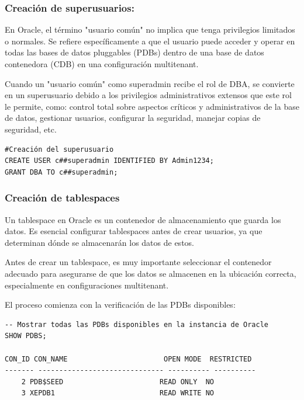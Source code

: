 \documentclass{article}
\begin{document}
\subsubsection{Creación de superusuarios:}

En Oracle, el término "usuario común" no implica que tenga privilegios limitados o normales. Se refiere específicamente a que el usuario puede acceder y operar en todas las bases de datos pluggables (PDBs) dentro de una base de datos contenedora (CDB) en una configuración multitenant. 

Cuando un "usuario común" como superadmin recibe el rol de DBA, se convierte en un superusuario debido a los privilegios administrativos extensos que este rol le permite, como: control total sobre aspectos críticos y administrativos de la base de datos, gestionar usuarios, configurar la seguridad, manejar copias de seguridad, etc.
\begin{lstlisting}[style=bashStyle]
#Creación del superusuario
CREATE USER c##superadmin IDENTIFIED BY Admin1234;
GRANT DBA TO c##superadmin;
\end{lstlisting}

\vspace{5mm}

\subsubsection{Creación de tablespaces}

Un tablespace en Oracle es un contenedor de almacenamiento que guarda los datos. Es esencial configurar tablespaces antes de crear usuarios, ya que determinan dónde se almacenarán los datos de estos.

Antes de crear un tablespace, es muy importante seleccionar el contenedor adecuado para asegurarse de que los datos se almacenen en la ubicación correcta, especialmente en configuraciones multitenant. 

El proceso comienza con la verificación de las PDBs disponibles:

\begin{lstlisting}[style=bashStyle]
-- Mostrar todas las PDBs disponibles en la instancia de Oracle
SHOW PDBS;

CON_ID CON_NAME                       OPEN MODE  RESTRICTED
------- ------------------------------ ---------- ----------
    2 PDB$SEED                       READ ONLY  NO
    3 XEPDB1                         READ WRITE NO
\end{lstlisting}
\end{document}
